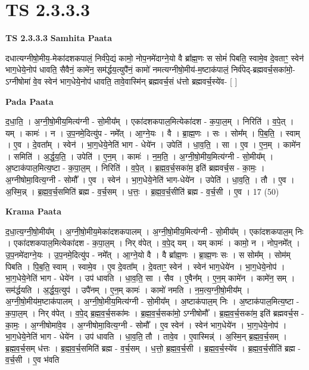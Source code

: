 \documentclass[17pt]{extarticle}
\begin{document}
\section{ TS 2.3.3.3 }

\textbf{TS 2.3.3.3 } \newline
\textbf{Samhita Paata} \newline

दधात्यग्नीषो॒मीय॒-मेका॑दशकपालं॒ निर्व॑पे॒द्यं कामो॒ नोप॒नमे॑दाग्ने॒यो वै ब्रा᳚ह्म॒णः स सोमं॑ पिबति॒ स्वामे॒व दे॒वताꣳ॒॒ स्वेन॑ भाग॒धेये॒नोप॑ धावति॒ सैवैनं॒ कामे॑न॒ सम॑र्द्धय॒त्युपै॑नं॒ कामो॑ नमत्यग्नीषो॒मीय॑-म॒ष्टाक॑पालं॒ निर्व॑पेद्-ब्रह्मवर्च॒सका॑मो॒-ऽग्नीषोमा॑ वे॒व स्वेन॑ भाग॒धेये॒नोप॑ धावति॒ तावे॒वास्मि॑न् ब्रह्मवर्च॒सं ध॑त्तो ब्रह्मवर्च॒स्ये॑व- [  ] \newline

\textbf{Pada Paata} \newline

द॒धा॒ति॒ । अ॒ग्नी॒षो॒मीय॒मित्य॑ग्नी - सो॒मीय᳚म् । एका॑दशकपाल॒मित्येका॑दश - क॒पा॒ल॒म् । निरिति॑ । व॒पे॒त् । यम् । कामः॑ । न । उ॒प॒नमे॒दित्यु॑प - नमे᳚त् । आ॒ग्ने॒यः । वै । ब्रा॒ह्म॒णः । सः । सोम᳚म् । पि॒ब॒ति॒ । स्वाम् । ए॒व । दे॒वता᳚म् । स्वेन॑ । भा॒ग॒धेये॒नेति॑ भाग - धेये॑न । उपेति॑ । धा॒व॒ति॒ । सा । ए॒व । ए॒न॒म् । कामे॑न । समिति॑ । अ॒र्द्ध॒य॒ति॒ । उपेति॑ । ए॒न॒म् । कामः॑ । न॒म॒ति॒ । अ॒ग्नी॒षो॒मीय॒मित्य॑ग्नी - सो॒मीय᳚म् । अ॒ष्टाक॑पाल॒मित्य॒ष्टा - क॒पा॒ल॒म् । निरिति॑ । व॒पे॒त् । ब्र॒ह्म॒व॒र्च॒सका॑म॒ इति॑ ब्रह्मवर्च॒स - का॒मः॒ । अ॒ग्नीषोमा॒वित्य॒ग्नी - सोमौ᳚ । ए॒व । स्वेन॑ । भा॒ग॒धेये॒नेति॑ भाग-धेये॑न । उपेति॑ । धा॒व॒ति॒ । तौ । ए॒व । अ॒स्मि॒न्न् । ब्र॒ह्म॒व॒र्च॒समिति॑ ब्रह्म - व॒र्च॒सम् । ध॒त्तः॒ । ब्र॒ह्म॒व॒र्च॒सीति॑ ब्रह्म - व॒र्च॒सी । ए॒व । 17 (50)  \newline


\textbf{Krama Paata} \newline

द॒धा॒त्य॒ग्नी॒षो॒मीय᳚म् । अ॒ग्नी॒षो॒मीय॒मेका॑दशकपालम् । अ॒ग्नी॒षो॒मीय॒मित्य॑ग्नी - सो॒मीय᳚म् । एका॑दशकपाल॒म् निः । एका॑दशकपाल॒मित्येका॑दश - क॒पा॒ल॒म् । निर् व॑पेत् । व॒पे॒द् यम् । यम् कामः॑ । कामो॒ न । नोप॒नमे᳚त् । उ॒प॒नमे॑दाग्ने॒यः । उ॒प॒नमे॒दित्यु॑प - नमे᳚त् । आ॒ग्ने॒यो वै । वै ब्रा᳚ह्म॒णः । ब्रा॒ह्म॒णः सः । स सोम᳚म् । सोम॑म् पिबति । पि॒ब॒ति॒ स्वाम् । स्वामे॒व । ए॒व दे॒वता᳚म् । दे॒वताꣳ॒॒ स्वेन॑ । स्वेन॑ भाग॒धेये॑न । भा॒ग॒धेये॒नोप॑ । भा॒ग॒धेये॒नेति॑ भाग - धेये॑न । उप॑ धावति । धा॒व॒ति॒ सा । सैव । ए॒वैन᳚म् । ए॒न॒म् कामे॑न । कामे॑न॒ सम् । सम॑र्द्धयति । अ॒र्द्ध॒य॒त्युप॑ । उपै॑नम् । ए॒न॒म् कामः॑ । कामो॑ नमति । न॒म॒त्य॒ग्नी॒षो॒मीय᳚म् । अ॒ग्नी॒षो॒मीय॑म॒ष्टाक॑पालम् । अ॒ग्नी॒षो॒मीय॒मित्य॑ग्नी - सो॒मीय᳚म् । अ॒ष्टाक॑पाल॒म् निः । अ॒ष्टाक॑पाल॒मित्य॒ष्टा - क॒पा॒ल॒म् । निर् व॑पेत् । व॒पे॒द् ब्र॒ह्म॒व॒र्च॒सका॑मः । ब्र॒ह्म॒व॒र्च॒सका॑मो॒ ऽग्नीषोमौ᳚ । ब्र॒ह्म॒व॒र्च॒सका॑म॒ इति॑ ब्रह्मवर्च॒स - का॒मः॒ । अ॒ग्नीषोमा॑वे॒व । अ॒ग्नीषोमा॒वित्य॒ग्नी - सोमौ᳚ । ए॒व स्वेन॑ । स्वेन॑ भाग॒धेये॑न । भा॒ग॒धेये॒नोप॑ । भा॒ग॒धेये॒नेति॑ भाग - धेये॑न । उप॑ धावति । धा॒व॒ति॒ तौ । तावे॒व । ए॒वास्मिन्न्॑ । अ॒स्मि॒न् ब्र॒ह्म॒व॒र्च॒सम् । ब्र॒ह्म॒व॒र्च॒सम् ध॑त्तः । ब्र॒ह्म॒व॒र्च॒समिति॑ ब्रह्म - व॒र्च॒सम् । ध॒त्तो॒ ब्र॒ह्म॒व॒र्च॒सी । ब्र॒ह्म॒व॒र्च॒स्ये॑व । ब्र॒ह्म॒व॒र्च॒सीति॑ ब्रह्म - व॒र्च॒सी । ए॒व भ॑वति \newline
\end{document}
